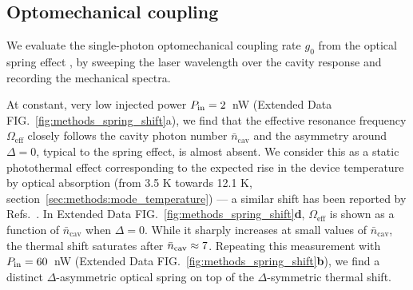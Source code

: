 \documentclass[./Main-revtex.tex]{subfiles}
\begin{document}




\subsection{Optomechanical coupling}
\label{sec:methods:char_coupling}
We evaluate the single-photon optomechanical coupling rate $g_0$ from the optical spring effect \cite{bowen2015quantum}, by sweeping the laser wavelength over the cavity response and recording the mechanical spectra.

At constant, very low injected power $P_\text{in} = 2$~nW (Extended Data FIG.~\ref{fig:methods_spring_shift}a), we find that the effective resonance frequency $\Omega_\text{eff}$ closely follows the cavity photon number $\bar{n}_\text{cav}$ and the asymmetry around $\Delta=0$, typical to the spring effect, is almost absent. We consider this as a static photothermal effect corresponding to the expected rise in the device temperature by optical absorption (from 3.5 K towards 12.1 K, section~\ref{sec:methods:mode_temperature}) --- a similar shift has been reported by Refs.~\cite{usami2012optical,hauer2019dueling}. In Extended Data FIG.~\ref{fig:methods_spring_shift}\textbf{d}, $\Omega_\text{eff}$ is shown as a function of $\bar{n}_\text{cav}$ when $\Delta = 0$. While it sharply increases at small values of $\bar{n}_\text{cav}$, the thermal shift saturates after $\bar{n}_\text{cav} \approx 7$. Repeating this measurement with $P_\text{in} = 60$~nW (Extended Data FIG.~\ref{fig:methods_spring_shift}\textbf{b}), we find a distinct $\Delta$-asymmetric optical spring on top of the $\Delta$-symmetric thermal shift.
\end{document}
